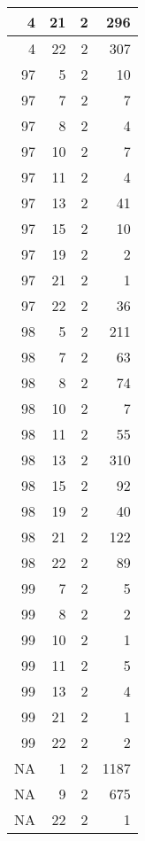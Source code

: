 \documentclass[]{article}
\begin{document}
\begin{tabular}{r|r|r|r}
\hline
4 & 21 & 2 & 296\\
\hline
4 & 22 & 2 & 307\\
\hline
97 & 5 & 2 & 10\\
\hline
97 & 7 & 2 & 7\\
\hline
97 & 8 & 2 & 4\\
\hline
97 & 10 & 2 & 7\\
\hline
97 & 11 & 2 & 4\\
\hline
97 & 13 & 2 & 41\\
\hline
97 & 15 & 2 & 10\\
\hline
97 & 19 & 2 & 2\\
\hline
97 & 21 & 2 & 1\\
\hline
97 & 22 & 2 & 36\\
\hline
98 & 5 & 2 & 211\\
\hline
98 & 7 & 2 & 63\\
\hline
98 & 8 & 2 & 74\\
\hline
98 & 10 & 2 & 7\\
\hline
98 & 11 & 2 & 55\\
\hline
98 & 13 & 2 & 310\\
\hline
98 & 15 & 2 & 92\\
\hline
98 & 19 & 2 & 40\\
\hline
98 & 21 & 2 & 122\\
\hline
98 & 22 & 2 & 89\\
\hline
99 & 7 & 2 & 5\\
\hline
99 & 8 & 2 & 2\\
\hline
99 & 10 & 2 & 1\\
\hline
99 & 11 & 2 & 5\\
\hline
99 & 13 & 2 & 4\\
\hline
99 & 21 & 2 & 1\\
\hline
99 & 22 & 2 & 2\\
\hline
NA & 1 & 2 & 1187\\
\hline
NA & 9 & 2 & 675\\
\hline
NA & 22 & 2 & 1\\
\hline
\end{tabular}
\end{document}
